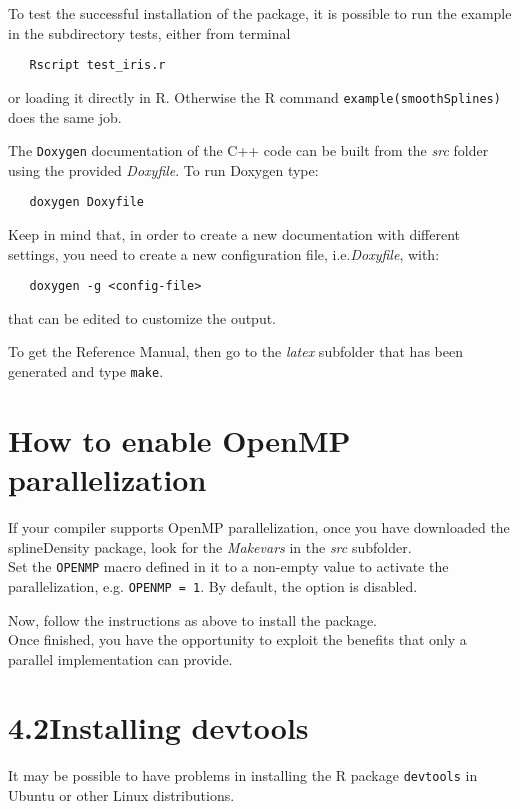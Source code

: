 \medskip

To test the successful installation of the package, it is possible to run the example in the subdirectory tests, either from terminal
\begin{verbatim}
   Rscript test_iris.r
\end{verbatim}
or loading it directly in R. Otherwise the R command \verb|example(smoothSplines)| does the same job.

\medskip

The \verb|Doxygen| documentation of the C++ code can be built from the \textit{src} folder using the provided \textit{Doxyfile}. To run Doxygen type:
\begin{verbatim}
   doxygen Doxyfile
\end{verbatim}
Keep in mind that, in order to create a new documentation with different settings, you need to create a new configuration file, i.e.\textit{Doxyfile}, with:
\begin{verbatim}
   doxygen -g <config-file>
\end{verbatim}
that can be edited to customize the output.

To get the Reference Manual, then go to the \textit{latex} subfolder that has been generated and type \verb|make|.



\section{How to enable OpenMP parallelization}
If your compiler supports OpenMP parallelization, once you have downloaded the splineDensity package, look for the \textit{Makevars} in the \textit{src} subfolder.\\
Set the \verb|OPENMP| macro defined in it to a non-empty value to activate the parallelization, e.g. \verb|OPENMP = 1|. By default, the option is disabled.

Now, follow the instructions as above to install the package. \\
Once finished, you have the opportunity to exploit the benefits that only a parallel implementation can provide.



\section*{4.2\quad Installing devtools}
It may be possible to have problems in installing the R package \verb|devtools| in Ubuntu or other Linux distributions.

